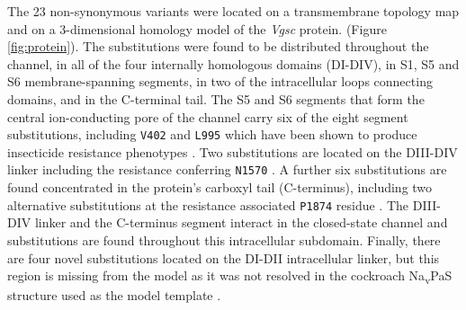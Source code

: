 \documentclass[a4paper,11pt,abstracton,hidelinks]{scrartcl}
\begin{document}
The 23 non-synonymous variants were located on a transmembrane topology map and on a 3-dimensional homology model of the \textit{Vgsc} protein. (Figure \ref{fig:protein}).
The substitutions were found to be distributed throughout the channel, in all of the four internally homologous domains (DI-DIV), in S1, S5 and S6 membrane-spanning segments, in two of the intracellular loops connecting domains, and in the C-terminal tail.
%
The S5 and S6 segments that form the central ion-conducting pore of the channel carry six of the eight segment substitutions, including \texttt{V402} and \texttt{L995} which have been shown to produce insecticide resistance phenotypes \cite{Davies2007a, Dong2014, Martinez-Torres1998,Silva2014, Ranson2000}.
%
Two substitutions are located on the DIII-DIV linker including the resistance conferring \texttt{N1570} \cite{Jones2012}.
%
A further six substitutions are found concentrated in the protein's carboxyl tail (C-terminus), including two alternative substitutions at the resistance associated \texttt{P1874} residue \cite{Sonoda2008}.
%
The DIII-DIV linker and the C-terminus segment interact in the closed-state channel and substitutions are found throughout this intracellular subdomain.
%
Finally, there are four novel substitutions located on the DI-DII intracellular linker, but this region is missing from the model as it was not resolved in the cockroach Na\textsubscript{v}PaS structure used as the model template \cite{Shen2017}.
\end{document}
